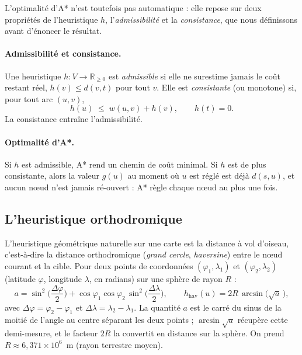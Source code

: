 \medskip

L'optimalité d'A* n'est toutefois pas automatique : elle repose sur deux
propriétés de l'heuristique $h$, l'\emph{admissibilité} et la \emph{consistance}, que nous définissons avant d'énoncer le résultat.

\medskip

\paragraph{Admissibilité et consistance.}
Une heuristique $h : V \to \mathbb{R}_{\ge 0}$ est \emph{admissible} si elle ne
surestime jamais le coût restant réel, $h(v) \le d(v, t)$ pour tout $v$. Elle est
\emph{consistante} (ou monotone) si, pour tout arc $(u, v)$,
\[
  h(u) \;\le\; w(u, v) + h(v), \qquad h(t) = 0 .
\]
La consistance entraîne l'admissibilité.

\paragraph{Optimalité d'A*.}
Si $h$ est admissible, A* rend un chemin de coût minimal. Si $h$ est de plus
consistante, alors la valeur $g(u)$ au moment où $u$ est réglé est déjà $d(s,u)$,
et aucun nœud n'est jamais ré-ouvert : A* règle chaque nœud au plus une fois.

\subsection{L'heuristique orthodromique}
\label{sec:haversine}

L'heuristique géométrique naturelle sur une carte est la distance à vol d'oiseau,
c'est-à-dire la distance orthodromique (\emph{grand cercle}, \emph{haversine})
entre le nœud courant et la cible. Pour deux points de coordonnées
$(\varphi_1, \lambda_1)$ et $(\varphi_2, \lambda_2)$ (latitude $\varphi$,
longitude $\lambda$, en radians) sur une sphère de rayon $R$ :
\[
  a = \sin^2\!\Big(\frac{\Delta\varphi}{2}\Big)
      + \cos\varphi_1 \cos\varphi_2 \, \sin^2\!\Big(\frac{\Delta\lambda}{2}\Big),
  \qquad
  h_{\text{hav}}(u) = 2R \, \operatorname{arcsin}\!\big(\sqrt{a}\,\big),
\]
avec $\Delta\varphi = \varphi_2 - \varphi_1$ et
$\Delta\lambda = \lambda_2 - \lambda_1$. La quantité $a$ est le carré du sinus de
la moitié de l'angle au centre séparant les deux points ; $\operatorname{arcsin}
\sqrt{a}$ récupère cette demi-mesure, et le facteur $2R$ la convertit en distance
sur la sphère. On prend $R \approx 6{,}371 \times 10^{6}$~m (rayon terrestre
moyen).

